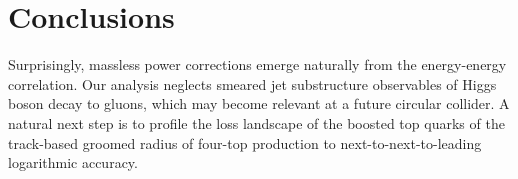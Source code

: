 \section{Conclusions}\label{sec:conclusions}

Surprisingly, massless power corrections emerge naturally from the
energy-energy correlation. Our analysis neglects smeared jet
substructure observables of Higgs boson decay to gluons, which may
become relevant at a future circular collider. A natural next step is to
profile the loss landscape of the boosted top quarks of the track-based
groomed radius of four-top production to next-to-next-to-leading
logarithmic accuracy.

